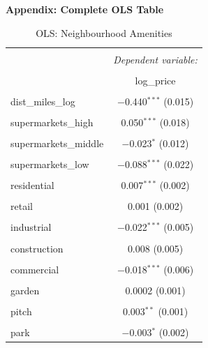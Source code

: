 \documentclass{article}
\begin{document}

\newpage
\textbf{Appendix: Complete OLS Table}
\begin{table}[H] \centering 
  \caption{OLS: Neighbourhood Amenities} 
  \label{table:complete} 
\small 
\begin{tabular}{@{\extracolsep{-10pt}}lc} 
\\[-1.8ex]\hline 
\hline \\[-1.8ex] 
 & \multicolumn{1}{c}{\textit{Dependent variable:}} \\ 
\cline{2-2} 
\\[-1.8ex] & log\_price \\ 
\hline \\[-1.8ex] 
 dist\_miles\_log & $-$0.440$^{***}$ (0.015) \\ 
  & \\ 
 supermarkets\_high & 0.050$^{***}$ (0.018) \\ 
  & \\ 
 supermarkets\_middle & $-$0.023$^{*}$ (0.012) \\ 
  & \\ 
 supermarkets\_low & $-$0.088$^{***}$ (0.022) \\ 
  & \\ 
 residential & 0.007$^{***}$ (0.002) \\ 
  & \\ 
 retail & 0.001 (0.002) \\ 
  & \\ 
 industrial & $-$0.022$^{***}$ (0.005) \\ 
  & \\ 
 construction & 0.008 (0.005) \\ 
  & \\ 
 commercial & $-$0.018$^{***}$ (0.006) \\ 
  & \\ 
 garden & 0.0002 (0.001) \\ 
  & \\ 
 pitch & 0.003$^{**}$ (0.001) \\ 
  & \\ 
 park & $-$0.003$^{*}$ (0.002) \\ 

\end{tabular}
\end{table}
\end{document}

